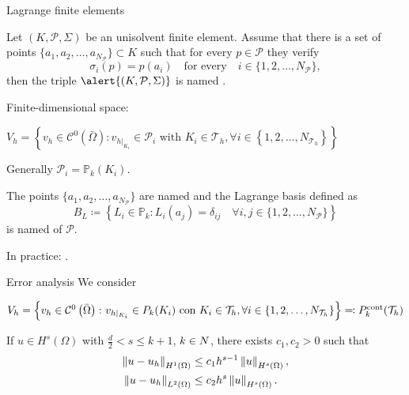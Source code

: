 \begin{frame}{Lagrange finite elements}
	\scriptsize
\begin{definicion}
	Let $\left(K,\mathcal{P},\Sigma\right)$ be an unisolvent finite element. Assume that there is a set of points $\{a_1,a_2,\ldots,a_{N_\mathcal{P}}\}\subset K$ such that for every $p\in\mathcal{P}$ they verify $$\sigma_i(p)=p(a_i)\quad\text{for every}\quad i\in\{1,2,\ldots,N_{\mathcal{P}}\},$$ then the triple $\alert{\left(K,\mathcal{P},\Sigma\right)}$ is named .
\end{definicion}

Finite-dimensional space:
\begin{block}{}
	\begin{center}
	$V_h=\left\{v_h\in \mathcal{C}^0\left(\bar\Omega\right)\colon v_{h|_{K_i}}\in \mathcal{P}_i \text{ with } K_i\in\mathcal{T}_h, \forall i\in\left\{1,2,\ldots,N_{\mathcal{T}_h} \right\}\right\}$
	\end{center}
	\end{block}
	
	
	Generally $\mathcal{P}_i=\mathbb{P}_k(K_i)$.

	\begin{block}{}
		The points $\{a_1,a_2,\ldots,a_{N_\mathcal{P}}\}$ are named  and the Lagrange basis defined as $$B_L\coloneqq\left\{L_i\in\mathbb{P}_k\colon L_i(a_j)=\delta_{ij}\quad\forall i,j\in\{1,2,\ldots,N_\mathcal{P}\} \right\}$$ is named  of $\mathcal{P}$.
	\end{block}

	In practice: .
\end{frame}

\begin{frame}{Error analysis}
	We consider
	\begin{block}{}
		\begin{center}
		{\scriptsize $V_h=\left\{v_h\in \mathcal{C}^0\left(\bar\Omega\right)\colon v_{h|_{K_i}}\in \relax{P}_k(K_i) \text{ con } K_i\in\mathcal{T}_h, \forall i\in\left\{1,2,\ldots,N_{\mathcal{T}_h} \right\}\right\}\eqqcolon\relax{P}^{\text{cont}}_k(\mathcal{T}_h)$}
		\end{center}
	\end{block}

	\vspace*{1cm}
	\begin{theorem}
		If $u\in H^s(\Omega)$ with $\frac{d}{2}<s\le k+1$, $k\in\relax N$, there exists $c_1,c_2>0$ such that
		\begin{align*}
			\left\|u-u_h\right\|_{H^1(\Omega)}&\le c_1 h^{s-1}\left\|u\right\|_{H^s(\Omega)},\\
			\left\|u-u_h\right\|_{L^2(\Omega)}&\le c_2 h^{s}\left\|u\right\|_{H^s(\Omega)}.
		\end{align*}
	\end{theorem}
\end{frame}

